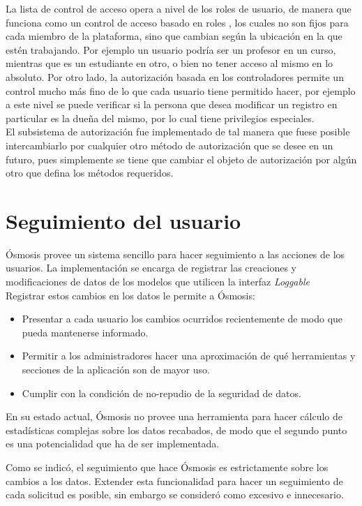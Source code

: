 La lista de control de acceso opera a nivel de los roles de usuario, de manera que funciona como un control de acceso basado en roles \citep{RBAC1996}, los cuales no son fijos para cada miembro de la plataforma, sino que cambian según la ubicación en la que estén trabajando. Por ejemplo un usuario podría ser un profesor en un curso, mientras que es un estudiante en otro, o bien no tener acceso al mismo en lo absoluto. Por otro lado, la autorización basada en los controladores permite un control mucho más fino de lo que cada usuario tiene permitido hacer, por ejemplo a este nivel se puede verificar si la persona que desea modificar un registro en particular es la dueña del mismo, por lo cual tiene privilegios especiales.\\

El subsistema de autorización fue implementado de tal manera que fuese posible intercambiarlo por cualquier otro método de autorización que se desee en un futuro, pues simplemente se tiene que cambiar el objeto de autorización por algún otro que defina los métodos requeridos.

\section{Seguimiento del usuario}
Ósmosis provee un sistema sencillo para hacer seguimiento a las acciones de los usuarios. La implementación se encarga de registrar las creaciones y modificaciones de datos de los modelos que utilicen la interfaz \emph{Loggable}\\

Registrar estos cambios en los datos le permite a Ósmosis:
\begin{itemize}
	\item Presentar a cada usuario los cambios ocurridos recientemente de modo que pueda mantenerse informado.
	\item Permitir a los administradores hacer una aproximación de qué herramientas y secciones de la aplicación son de mayor uso.
	\item Cumplir con la condición de no-repudio \citep{Calderon2007} de la seguridad de datos.
\end{itemize}

En su estado actual, Ósmosis no provee una herramienta para hacer cálculo de estadísticas complejas sobre los datos recabados, de modo que el segundo punto es una potencialidad que ha de ser implementada.

Como se indicó, el seguimiento que hace Ósmosis es estrictamente sobre los cambios a los datos. Extender esta funcionalidad para hacer un seguimiento de cada solicitud es posible, sin embargo se consideró como excesivo e innecesario.

